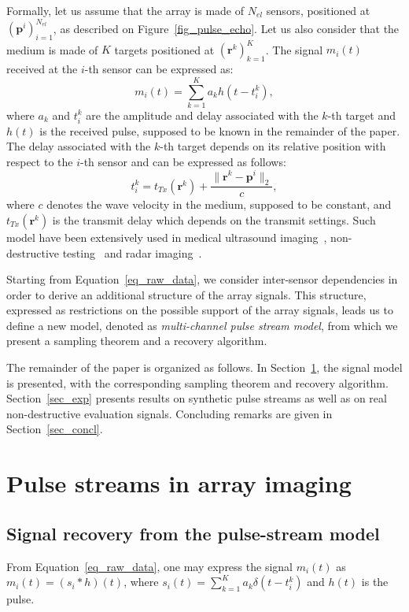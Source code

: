 \documentclass{article}
\newcommand{\vect}[1]{\bm{#1}}
\newcommand{\ser}[2]{#1^{#2}}
\theoremstyle{definition}
\begin{document}
Formally, let us assume that the array is made of $N_{el}$ sensors, positioned at $\left(\vect{p}^i\right)_{i=1}^{N_{el}}$, as described on Figure~\ref{fig_pulse_echo}. 
Let us also consider that the medium is made of $K$ targets positioned at $\left(\vect{r}^k\right)_{k=1}^K$. The signal $m_{i} \left(t\right)$ received at the $i$-th sensor can be expressed as:
\begin{equation}
\label{eq_raw_data}
m_{i} \left(t\right) = \sum \limits_{k=1}^{K} a_k h\left(t - t_i^k\right), 
\end{equation}
where $a_k$ and $t_i^k$ are the amplitude and delay associated with the $k$-th target and $h\left(t\right)$ is the received pulse, supposed to be known in the remainder of the paper. 
The delay associated with the $k$-th target depends on its relative position with respect to the $i$-th sensor and can be expressed as follows:
\begin{equation}
\label{eq_usdelay}
t_i^k = t_{Tx}\left(\vect{r}^k\right) + \frac{\|\vect{r}^k -  \vect{p}^i \|_2}{c},
\end{equation}
where $c$ denotes the wave velocity in the medium, supposed to be constant, and $t_{Tx}\left(\vect{r}^k\right)$ is the transmit delay which depends on the transmit settings. Such model have been extensively used in medical ultrasound imaging~\cite{Chernyakova2014, Tur_TSP_2012, Bendory_TSP_2016}, non-destructive testing~\cite{Carcreff_UFFC_2014} and radar imaging~\cite{Ilan_TSP_2014, Baraniuk2007}. 

Starting from Equation~\eqref{eq_raw_data}, we consider inter-sensor dependencies in order to derive an additional structure of the array signals. 
This structure, expressed as restrictions on the possible support of the array signals, leads us to define a new model, denoted as \textit{multi-channel pulse stream model}, from which we present a sampling theorem and a recovery algorithm.

The remainder of the paper is organized as follows. 
In Section~\ref{sec_pulsestreams_US}, the signal model is presented, with the corresponding sampling theorem and recovery algorithm. 
Section~\ref{sec_exp} presents results on synthetic pulse streams as well as on real non-destructive evaluation signals. Concluding remarks are given in Section~\ref{sec_concl}.
\section{Pulse streams in array imaging}
\label{sec_pulsestreams_US}
\subsection{Signal recovery from the pulse-stream model}
\label{subsec_US_pulsestream}
From Equation~\eqref{eq_raw_data}, one may express the signal $m_i\left(t\right)$ as $m_i\left(t\right) = \left(s_i \ast h\right)\left(t\right)$, where $s_i \left(t\right) = \sum \limits_{k=1}^{K} a_k \delta\left(t - \ser{t_i}{k}\right)$ and $h\left(t\right)$ is the pulse. 
\end{document}
